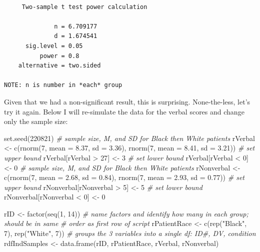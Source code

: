 \documentclass[
  11pt,
]{book}
\newenvironment{Shaded}{\begin{snugshade}}{\end{snugshade}}
\newcommand{\AttributeTok}[1]{\textcolor[rgb]{0.77,0.63,0.00}{#1}}
\newcommand{\CommentTok}[1]{\textcolor[rgb]{0.56,0.35,0.01}{\textit{#1}}}
\newcommand{\DecValTok}[1]{\textcolor[rgb]{0.00,0.00,0.81}{#1}}
\newcommand{\FloatTok}[1]{\textcolor[rgb]{0.00,0.00,0.81}{#1}}
\newcommand{\FunctionTok}[1]{\textcolor[rgb]{0.00,0.00,0.00}{#1}}
\newcommand{\NormalTok}[1]{#1}
\newcommand{\OtherTok}[1]{\textcolor[rgb]{0.56,0.35,0.01}{#1}}
\newcommand{\SpecialCharTok}[1]{\textcolor[rgb]{0.00,0.00,0.00}{#1}}
\newcommand{\StringTok}[1]{\textcolor[rgb]{0.31,0.60,0.02}{#1}}
\begin{document}
\begin{verbatim}

     Two-sample t test power calculation 

              n = 6.709177
              d = 1.674541
      sig.level = 0.05
          power = 0.8
    alternative = two.sided

NOTE: n is number in *each* group
\end{verbatim}

Given that we had a non-significant result, this is surprising. None-the-less, let's try it again. Below I will re-simulate the data for the verbal scores and change only the sample size:

\begin{Shaded}
\begin{Highlighting}[]
\FunctionTok{set.seed}\NormalTok{(}\DecValTok{220821}\NormalTok{)}
\CommentTok{\# sample size, M, and SD for Black then White patients}
\NormalTok{rVerbal }\OtherTok{\textless{}{-}} \FunctionTok{c}\NormalTok{(}\FunctionTok{rnorm}\NormalTok{(}\DecValTok{7}\NormalTok{, }\AttributeTok{mean =} \FloatTok{8.37}\NormalTok{, }\AttributeTok{sd =} \FloatTok{3.36}\NormalTok{), }\FunctionTok{rnorm}\NormalTok{(}\DecValTok{7}\NormalTok{, }\AttributeTok{mean =} \FloatTok{8.41}\NormalTok{, }\AttributeTok{sd =} \FloatTok{3.21}\NormalTok{))}
\CommentTok{\# set upper bound}
\NormalTok{rVerbal[rVerbal }\SpecialCharTok{\textgreater{}} \DecValTok{27}\NormalTok{] }\OtherTok{\textless{}{-}} \DecValTok{3}
\CommentTok{\# set lower bound}
\NormalTok{rVerbal[rVerbal }\SpecialCharTok{\textless{}} \DecValTok{0}\NormalTok{] }\OtherTok{\textless{}{-}} \DecValTok{0}
\CommentTok{\# sample size, M, and SD for Black then White patients}
\NormalTok{rNonverbal }\OtherTok{\textless{}{-}} \FunctionTok{c}\NormalTok{(}\FunctionTok{rnorm}\NormalTok{(}\DecValTok{7}\NormalTok{, }\AttributeTok{mean =} \FloatTok{2.68}\NormalTok{, }\AttributeTok{sd =} \FloatTok{0.84}\NormalTok{), }\FunctionTok{rnorm}\NormalTok{(}\DecValTok{7}\NormalTok{, }\AttributeTok{mean =} \FloatTok{2.93}\NormalTok{,}
    \AttributeTok{sd =} \FloatTok{0.77}\NormalTok{))}
\CommentTok{\# set upper bound}
\NormalTok{rNonverbal[rNonverbal }\SpecialCharTok{\textgreater{}} \DecValTok{5}\NormalTok{] }\OtherTok{\textless{}{-}} \DecValTok{5}
\CommentTok{\# set lower bound}
\NormalTok{rNonverbal[rNonverbal }\SpecialCharTok{\textless{}} \DecValTok{0}\NormalTok{] }\OtherTok{\textless{}{-}} \DecValTok{0}

\NormalTok{rID }\OtherTok{\textless{}{-}} \FunctionTok{factor}\NormalTok{(}\FunctionTok{seq}\NormalTok{(}\DecValTok{1}\NormalTok{, }\DecValTok{14}\NormalTok{))}
\CommentTok{\# name factors and identify how many in each group; should be in same}
\CommentTok{\# order as first row of script}
\NormalTok{rPatientRace }\OtherTok{\textless{}{-}} \FunctionTok{c}\NormalTok{(}\FunctionTok{rep}\NormalTok{(}\StringTok{"Black"}\NormalTok{, }\DecValTok{7}\NormalTok{), }\FunctionTok{rep}\NormalTok{(}\StringTok{"White"}\NormalTok{, }\DecValTok{7}\NormalTok{))}
\CommentTok{\# groups the 3 variables into a single df: ID\#, DV, condition}
\NormalTok{rdfIndSamples }\OtherTok{\textless{}{-}} \FunctionTok{data.frame}\NormalTok{(rID, rPatientRace, rVerbal, rNonverbal)}


\end{Highlighting}
\end{Shaded}
\end{document}
